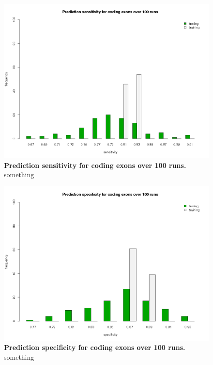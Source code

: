 \begin{figure}[ht]
	\begin{center}
		\includegraphics[scale=0.42]{pics/codingExons_sens.png}
	\caption[Prediction sensitivity for coding exons over 100 runs]{
	\textbf{Prediction sensitivity for coding exons over 100 runs.}
	something}
	\end{center}
	\label{fig:codingExons_sens}
\end{figure}

\begin{figure}[ht]
	\begin{center}
		\includegraphics[scale=0.42]{pics/codingExons_spec.png}
	\caption[Prediction specificity for coding exons over 100 runs]{
	\textbf{Prediction specificity for coding exons over 100 runs.}
	something}
	\end{center}
	\label{fig:codingExons_spec}
\end{figure}

